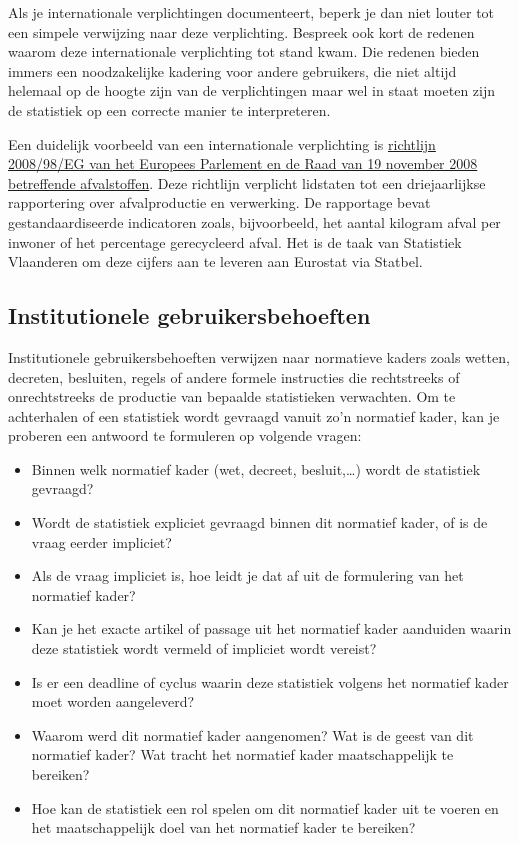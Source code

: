 \documentclass[\mainfiledir/00_handleiding_statistiekproductie.tex]{subfiles}
\begin{document}
Als je internationale verplichtingen documenteert, beperk je dan niet louter tot een simpele verwijzing naar deze verplichting. Bespreek ook kort de redenen waarom deze internationale verplichting tot stand kwam. Die redenen bieden immers een noodzakelijke kadering voor andere gebruikers, die niet altijd helemaal op de hoogte zijn van de verplichtingen maar wel in staat moeten zijn de statistiek op een correcte manier te interpreteren.

Een duidelijk voorbeeld van een internationale verplichting is \href{https://eur-lex.europa.eu/legal-content/NL/ALL/?uri=CELEX:32008L0098}{richtlijn 2008/98/EG van het Europees Parlement en de Raad van 19 november 2008 betreffende afvalstoffen}. Deze richtlijn verplicht lidstaten tot een driejaarlijkse rapportering over afvalproductie en verwerking. De rapportage bevat gestandaardiseerde indicatoren zoals, bijvoorbeeld, het aantal kilogram afval per inwoner of het percentage gerecycleerd afval. Het is de taak van Statistiek Vlaanderen om deze cijfers aan te leveren aan Eurostat via Statbel.





\subsection{Institutionele gebruikersbehoeften}

Institutionele gebruikersbehoeften verwijzen naar normatieve kaders zoals wetten, decreten, besluiten, regels of andere formele instructies die rechtstreeks of onrechtstreeks de productie van bepaalde statistieken verwachten. Om te achterhalen of een statistiek wordt gevraagd vanuit zo'n normatief kader, kan je proberen een antwoord te formuleren op volgende vragen:
\begin{itemize}[nosep]
    \item Binnen welk normatief kader (wet, decreet, besluit,\ldots) wordt de statistiek gevraagd? 
    \item Wordt de statistiek expliciet gevraagd binnen dit normatief kader, of is de vraag eerder impliciet?
    \item Als de vraag impliciet is, hoe leidt je dat af uit de formulering van het normatief kader?
    \item Kan je het exacte artikel of passage uit het normatief kader aanduiden waarin deze statistiek wordt vermeld of impliciet wordt vereist?
    \item Is er een deadline of cyclus waarin deze statistiek volgens het normatief kader moet worden aangeleverd?
    \item Waarom werd dit normatief kader aangenomen? Wat is de geest van dit normatief kader? Wat tracht het normatief kader maatschappelijk te bereiken?
    \item Hoe kan de statistiek een rol spelen om dit normatief kader uit te voeren en het maatschappelijk doel van het normatief kader te bereiken?
\end{itemize}
\end{document}
